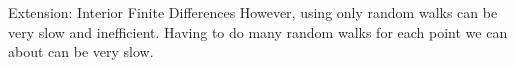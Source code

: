 \documentclass{beamer}
\begin{document}
\begin{frame}{Extension: Interior Finite Differences}
However, using only random walks can be very slow and inefficient.
Having to do many random walks for each point we can about can be very slow.
\end{frame}
\end{document}

